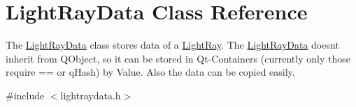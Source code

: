 \hypertarget{class_light_ray_data}{}\section{Light\+Ray\+Data Class Reference}
\label{class_light_ray_data}


The \hyperlink{class_light_ray_data}{Light\+Ray\+Data} class stores data of a \hyperlink{class_light_ray}{Light\+Ray}. The \hyperlink{class_light_ray_data}{Light\+Ray\+Data} doesn\textquotesingle{}t inherit from Q\+Object, so it can be stored in Qt-\/\+Containers (currently only those require == or q\+Hash) by Value. Also the data can be copied easily.  




{\ttfamily \#include $<$lightraydata.\+h$>$}

